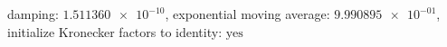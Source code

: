 damping: $\num[scientific-notation=true]{1.511360e-10}$, exponential moving average: $\num[scientific-notation=true]{9.990895e-01}$, initialize Kronecker factors to identity: $\text{yes}$